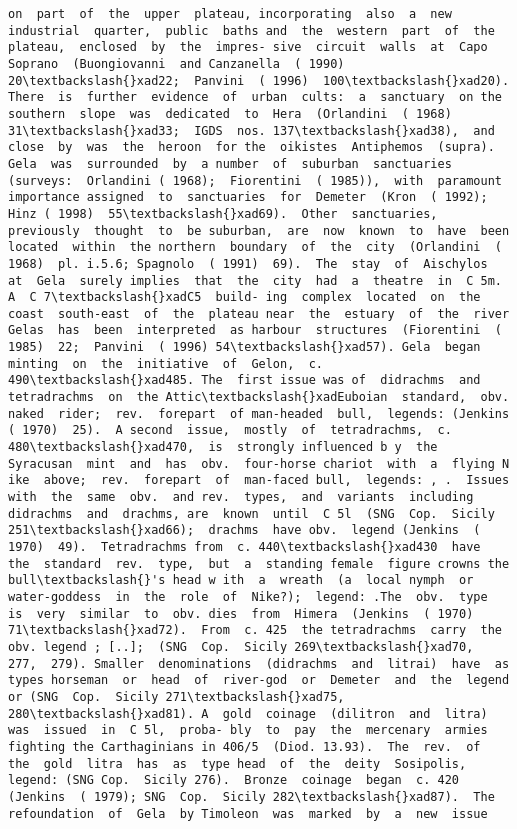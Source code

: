 \documentclass[11pt]{article}
\begin{document}
\begin{Verbatim}[commandchars=\\\{\}]
on  part  of  the  upper  plateau, incorporating  also  a  new  industrial  quarter,  public  baths and  the  western  part  of  the  plateau,  enclosed  by  the  impres- sive  circuit  walls  at  Capo  Soprano  (Buongiovanni  and Canzanella  ( 1990)  20\textbackslash{}xad22;  Panvini  ( 1996)  100\textbackslash{}xad20). There  is  further  evidence  of  urban  cults:  a  sanctuary  on the  southern  slope  was  dedicated  to  Hera  (Orlandini  ( 1968) 31\textbackslash{}xad33;  IGDS  nos. 137\textbackslash{}xad38),  and  close  by  was  the  heroon  for the  oikistes  Antiphemos  (supra).  Gela  was  surrounded  by  a number  of  suburban  sanctuaries  (surveys:  Orlandini ( 1968);  Fiorentini  ( 1985)),  with  paramount  importance assigned  to  sanctuaries  for  Demeter  (Kron  ( 1992);  Hinz ( 1998)  55\textbackslash{}xad69).  Other  sanctuaries,  previously  thought  to  be suburban,  are  now  known  to  have  been  located  within  the northern  boundary  of  the  city  (Orlandini  ( 1968)  pl. i.5.6; Spagnolo  ( 1991)  69).  The  stay  of  Aischylos  at  Gela  surely implies  that  the  city  had  a  theatre  in  C 5m.  A  C 7\textbackslash{}xadC5  build- ing  complex  located  on  the  coast  south-east  of  the  plateau near  the  estuary  of  the  river  Gelas  has  been  interpreted  as harbour  structures  (Fiorentini  ( 1985)  22;  Panvini  ( 1996) 54\textbackslash{}xad57). Gela  began  minting  on  the  initiative  of  Gelon,  c. 490\textbackslash{}xad485. The  first issue was of  didrachms  and  tetradrachms  on  the Attic\textbackslash{}xadEuboian  standard,  obv.  naked  rider;  rev.  forepart  of man-headed  bull,  legends: (Jenkins  ( 1970)  25).  A second  issue,  mostly  of  tetradrachms,  c. 480\textbackslash{}xad470,  is  strongly influenced b y  the  Syracusan  mint  and  has  obv.  four-horse chariot  with  a  flying N ike  above;  rev.  forepart  of  man-faced bull,  legends: , .  Issues  with  the  same  obv.  and rev.  types,  and  variants  including  didrachms  and  drachms, are  known  until  C 5l  (SNG  Cop.  Sicily 251\textbackslash{}xad66);  drachms  have obv.  legend (Jenkins  ( 1970)  49).  Tetradrachms from  c. 440\textbackslash{}xad430  have  the  standard  rev.  type,  but  a  standing female  figure crowns the bull\textbackslash{}'s head w ith  a  wreath  (a  local nymph  or  water-goddess  in  the  role  of  Nike?);  legend: .The  obv.  type  is  very  similar  to  obv. dies  from  Himera  (Jenkins  ( 1970)  71\textbackslash{}xad72).  From  c. 425  the tetradrachms  carry  the  obv. legend ; [..];  (SNG  Cop.  Sicily 269\textbackslash{}xad70,  277,  279). Smaller  denominations  (didrachms  and  litrai)  have  as  types horseman  or  head  of  river-god  or  Demeter  and  the  legend or (SNG  Cop.  Sicily 271\textbackslash{}xad75,  280\textbackslash{}xad81). A  gold  coinage  (dilitron  and  litra)  was  issued  in  C 5l,  proba- bly  to  pay  the  mercenary  armies  fighting the Carthaginians in 406/5  (Diod. 13.93).  The  rev.  of  the  gold  litra  has  as  type head  of  the  deity  Sosipolis,  legend: (SNG Cop.  Sicily 276).  Bronze  coinage  began  c. 420  (Jenkins  ( 1979); SNG  Cop.  Sicily 282\textbackslash{}xad87).  The  refoundation  of  Gela  by Timoleon  was  marked  by  a  new  issue 
\end{Verbatim}
\end{document}
